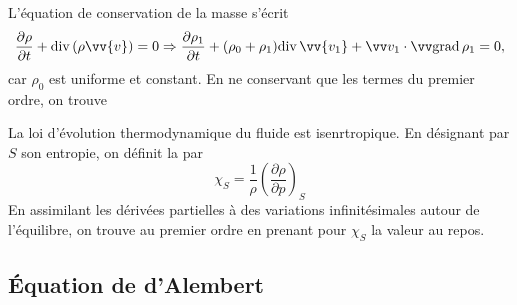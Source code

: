 \documentclass[12pt,fancy]{cours}
\begin{document}
  L'équation de conservation de la masse s'écrit
\begin{equation}
\frac{\partial \rho}{\partial t}+\dive{(\rho\vv{v})}=0 \Rightarrow \frac{\partial \rho_1}{\partial t}+ (\rho_0 + \rho_1) \dive{\vv{v_1}} + \Vec{v_1}\ps\grad\rho_1 =0,
\end{equation}
car $\rho_0$ est uniforme et constant. En ne conservant que les termes du premier ordre, on trouve

 La loi d'évolution thermodynamique du fluide est isenrtropique. En désignant par $S$ son entropie, on définit la  par
\begin{equation}
		\chi_{S}=\frac{1}{\rho}\left(\frac{\partial \rho}{\partial p}\right)_{S}
\end{equation}
 En assimilant les dérivées partielles à des variations infinitésimales autour de l'équilibre,
 on trouve au premier ordre
en prenant pour $\chi_S$ la valeur au repos. 

\subsection{Équation de d’Alembert}
\end{document}
